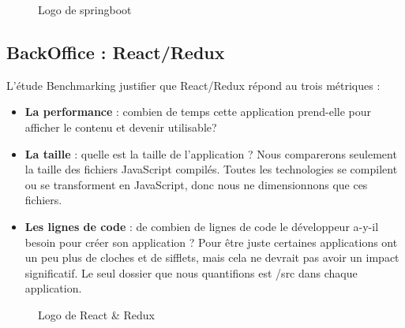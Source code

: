 \begin{figure}[H]
	\caption{\label{fig:my-label} Logo de springboot}
\end{figure}

\subsection{BackOffice : \textcolor{react}{React}/\textcolor{redux}{Redux}}

L'\'etude Benchmarking justifier que React/Redux r\'epond au trois m\'etriques :

\begin{itemize}
\item \textbf{La performance} : combien de temps cette application prend-elle pour afficher le contenu et devenir utilisable?
\item \textbf{La taille} : quelle est la taille de l'application ? Nous comparerons seulement la taille des fichiers JavaScript compil\'es. Toutes les technologies se compilent ou se transforment en JavaScript, donc nous ne dimensionnons que ces fichiers.
\item \textbf{Les lignes de code} : de combien de lignes de code le d\'eveloppeur a-y-il besoin pour cr\'eer son application ? Pour \^etre juste certaines applications ont un peu plus de cloches et de sifflets, mais cela ne devrait pas avoir un impact significatif. Le seul dossier que nous quantifions est /src dans chaque application.
\end{itemize}

\begin{figure}[H]
	\caption{\label{fig:my-label} Logo de React \& Redux}
\end{figure}

